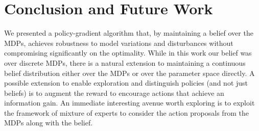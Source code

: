 \documentclass{article}
\begin{document}
\section{Conclusion and Future Work}
We presented a policy-gradient algorithm that, by maintaining a belief over the MDPs, achieves robustness to model variations and disturbances without compromising significantly on the optimality. While in this work our belief was over discrete MDPs, there is a natural extension to maintaining a continuous belief distribution either over the MDPs or over the parameter space directly. A possible extension to enable exploration and distinguish policies (and not just beliefs) is to augment the reward to encourage actions that achieve an information gain. An immediate interesting avenue worth exploring is to exploit the framework of mixture of experts to consider the action proposals from the MDPs along with the belief.


\end{document}
